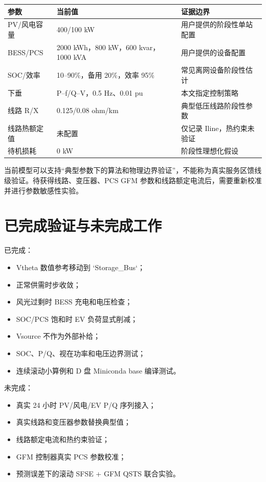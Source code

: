 \documentclass[UTF8,a4paper,11pt]{ctexart}
\begin{document}
\begin{longtable}{p{4.5cm}p{4.0cm}p{5.0cm}}
\toprule
\textbf{参数} & \textbf{当前值} & \textbf{证据边界}\\
\midrule
PV/风电容量 & 400/100 kW & 用户提供的阶段性单站配置\\
BESS/PCS & 2000 kWh，800 kW，600 kvar，1000 kVA & 用户提供的设备配置\\
SOC/效率 & 10--90\%，备用 20\%，效率 95\% & 常见离网设备阶段性估计\\
下垂 & P--f/Q--V，0.5 Hz、0.01 pu & 本文指定控制策略\\
线路 R/X & 0.125/0.08 ohm/km & 典型低压线路阶段性参数\\
线路热额定值 & 未配置 & 仅记录 Iline，热约束未验证\\
待机损耗 & 0 kW & 阶段性理想化假设\\
\bottomrule
\end{longtable}

当前模型可以支持“典型参数下的算法和物理边界验证”，不能称为真实服务区馈线级验证。待获得线路、变压器、PCS GFM 参数和线路额定电流后，需要重新校准并进行参数敏感性实验。

\section{已完成验证与未完成工作}

已完成：
\begin{itemize}
  \item Vtheta 数值参考移动到 `Storage\_Bus`；
  \item 正常供需时步收敛；
  \item 风光过剩时 BESS 充电和电压检查；
  \item SOC/PCS 饱和时 EV 负荷显式削减；
  \item Vsource 不作为外部补给；
  \item SOC、P/Q、视在功率和电压边界测试；
  \item 连续滚动小算例和 D 盘 Miniconda base 编译测试。
\end{itemize}

未完成：
\begin{itemize}
  \item 真实 24 小时 PV/风电/EV P/Q 序列接入；
  \item 真实线路和变压器参数替换典型值；
  \item 线路额定电流和热约束验证；
  \item GFM 控制器真实 PCS 参数校准；
  \item 预测误差下的滚动 SFSE + GFM QSTS 联合实验。
\end{itemize}
\end{document}
